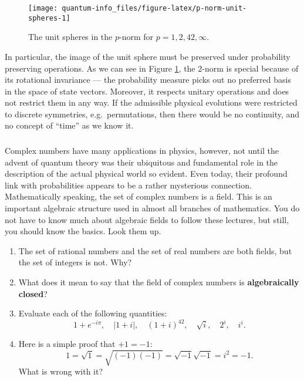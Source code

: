 \documentclass[fleqn]{article}
\providecommand{\tightlist}{%
  \setlength{\itemsep}{0pt}\setlength{\parskip}{0pt}}
\begin{document}
\begin{figure}[H]

{\centering \texttt{[image: quantum-info\_files/figure-latex/p-norm-unit-spheres-1]} 

}

\caption{The unit spheres in the \(p\)-norm for \(p=1,2,42,\infty\).}\label{fig:p-norm-unit-spheres}
\end{figure}

In particular, the image of the unit sphere must be preserved under probability preserving operations.
As we can see in Figure \ref{fig:p-norm-unit-spheres}, the \(2\)-norm is special because of its rotational invariance --- the probability measure picks out no preferred basis in the space of state vectors.
Moreover, it respects unitary operations and does not restrict them in any way.
If the admissible physical evolutions were restricted to discrete symmetries, e.g.~permutations, then there would be no continuity, and no concept of ``time'' as we know it.

\hypertarget{section-2}{%
\subsubsection{}\label{section-2}}

Complex numbers have many applications in physics, however, not until the advent of quantum theory was their ubiquitous and fundamental role in the description of the actual physical world so evident.
Even today, their profound link with probabilities appears to be a rather mysterious connection.
Mathematically speaking, the set of complex numbers is a field. This is an important algebraic structure used in almost all branches of mathematics.
You do not have to know much about algebraic fields to follow these lectures, but still, you should know the basics.
Look them up.

\begin{enumerate}
\def\labelenumi{\alph{enumi}.}
\tightlist
\item
  The set of rational numbers and the set of real numbers are both fields, but the set of integers is not. Why?
\item
  What does it mean to say that the field of complex numbers is \textbf{algebraically closed}?
\item
  Evaluate each of the following quantities:
  \[
   1+e^{-i\pi},
   \quad
   |1+i|,
   \quad
   (1+i)^{42},
   \quad
   \sqrt{i},
   \quad
   2^i,
   \quad
   i^i.
    \]
\item
  Here is a simple proof that \(+1=-1\): \[1=\sqrt{1}=\sqrt{(-1)(-1)}=\sqrt{-1}\sqrt{-1}=i^2=-1.\] What is wrong with it?
\end{enumerate}
\end{document}

